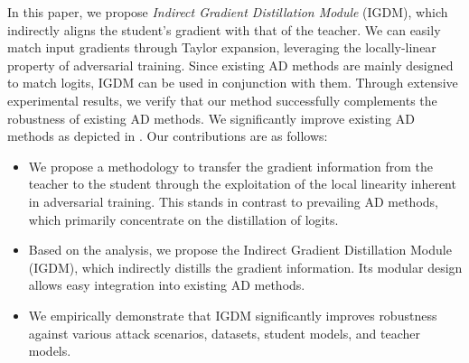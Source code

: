 \documentclass{article} %
\begin{document}
In this paper, we propose \textit{Indirect Gradient Distillation Module} (IGDM), which indirectly aligns the student's gradient with that of the teacher.
We can easily match input gradients through Taylor expansion, leveraging the locally-linear property of adversarial training.
Since existing AD methods are mainly designed to match logits, IGDM can be used in conjunction with them.
Through extensive experimental results, we verify that our method successfully complements the robustness of existing AD methods.
We significantly improve existing AD methods as depicted in .
Our contributions are as follows:
\begin{itemize}
\item We propose a methodology to transfer the gradient information from the teacher to the student through the exploitation of the local linearity inherent in adversarial training.
This stands in contrast to prevailing AD methods, which primarily concentrate on the distillation of logits.
\item Based on the analysis, we propose the Indirect Gradient Distillation Module (IGDM), which indirectly distills the gradient information. Its modular design allows easy integration into existing AD methods.
\item We empirically demonstrate that IGDM significantly improves robustness against various attack scenarios, datasets, student models, and teacher models.
\end{itemize}
\end{document}
